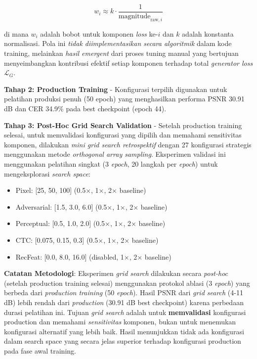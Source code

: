 \documentclass[12pt,a4paper]{article}
\begin{document}
\begin{equation}
w_i \approx k \cdot \frac{1}{\text{magnitude}_{\text{raw},i}}
\end{equation}

di mana $w_i$ adalah bobot untuk komponen \textit{loss} ke-$i$ dan $k$ adalah konstanta normalisasi. Pola ini \textit{tidak diimplementasikan secara algoritmik} dalam kode training, melainkan \textit{hasil emergent} dari proses tuning manual yang bertujuan menyeimbangkan kontribusi efektif setiap komponen terhadap total \textit{generator loss} $\mathcal{L}_G$.

\textbf{Tahap 2: Production Training} - Konfigurasi terpilih digunakan untuk pelatihan produksi penuh (50 epoch) yang menghasilkan performa PSNR 30.91 dB dan CER 34.9\% pada best checkpoint (epoch 44).

\textbf{Tahap 3: Post-Hoc Grid Search Validation} - Setelah production training selesai, untuk memvalidasi konfigurasi yang dipilih dan memahami sensitivitas komponen, dilakukan \textit{mini grid search retrospektif} dengan 27 konfigurasi strategis menggunakan metode \textit{orthogonal array sampling}. Eksperimen validasi ini menggunakan pelatihan singkat (3 \textit{epoch}, 20 langkah per \textit{epoch}) untuk mengeksplorasi \textit{search space}:

\begin{itemize}[leftmargin=*]
    \item Pixel: [25, 50, 100] (0.5×, 1×, 2× baseline)
    \item Adversarial: [1.5, 3.0, 6.0] (0.5×, 1×, 2× baseline)
    \item Perceptual: [0.5, 1.0, 2.0] (0.5×, 1×, 2× baseline)
    \item CTC: [0.075, 0.15, 0.3] (0.5×, 1×, 2× baseline)
    \item RecFeat: [0.0, 8.0, 16.0] (disabled, 1×, 2× baseline)
\end{itemize}

\textbf{Catatan Metodologi}: Eksperimen \textit{grid search} dilakukan secara \textit{post-hoc} (setelah production training selesai) menggunakan protokol ablasi (3 \textit{epoch}) yang berbeda dari \textit{production training} (50 \textit{epoch}). Hasil PSNR dari \textit{grid search} (4-11 dB) lebih rendah dari \textit{production} (30.91 dB best checkpoint) karena perbedaan durasi pelatihan ini. Tujuan \textit{grid search} adalah untuk \textbf{memvalidasi} konfigurasi production dan memahami \textit{sensitivitas} komponen, bukan untuk menemukan konfigurasi alternatif yang lebih baik. Hasil menunjukkan tidak ada konfigurasi dalam search space yang secara jelas superior terhadap konfigurasi production pada fase awal training.
\end{document}
